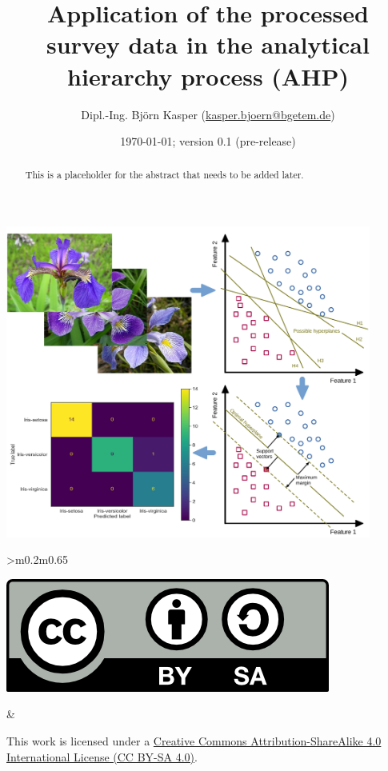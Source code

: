 \documentclass [oneside,10pt,a4paper,ngerman,BCOR10mm,headsepline,parindent,final]{scrartcl}
\title{\textbf{\textsf{Application of the processed survey data in the analytical hierarchy process (AHP)}}}\author{Dipl.-Ing. Bj\"orn Kasper (\href{mailto:kasper.bjoern@bgetem.de}{kasper.bjoern@bgetem.de})}\affil{BG ETEM}\date{\today; version 0.1 (pre-release)}
\begin{document}
    
    \pagestyle{empty}
    
    \maketitle\thispagestyle{empty}\begin{center}
        \includegraphics[width=0.90\textwidth]{images/Cover_image.pdf}
        \end{center}
        \vfill

    \begin{abstract}
    This is a placeholder for the abstract that needs to be added later.
    \end{abstract}
    \vfill
    
    \noindent
    \begin{center}
	    \begin{tabular}{>{\centering}m{0.2\textwidth}m{0.65\textwidth}}
	    \begin{minipage}{\linewidth}
	        \includegraphics{images/CC_BY-SA_40.png}
	    \end{minipage}
	    &
	    \begin{minipage}{\linewidth}
	        This work is licensed under a \href{https://creativecommons.org/licenses/by-sa/4.0/}{Creative Commons Attribution-ShareAlike 4.0 International License (CC BY-SA 4.0)}.
	    \end{minipage}
	    \end{tabular}
	\end{center}
\end{document}
